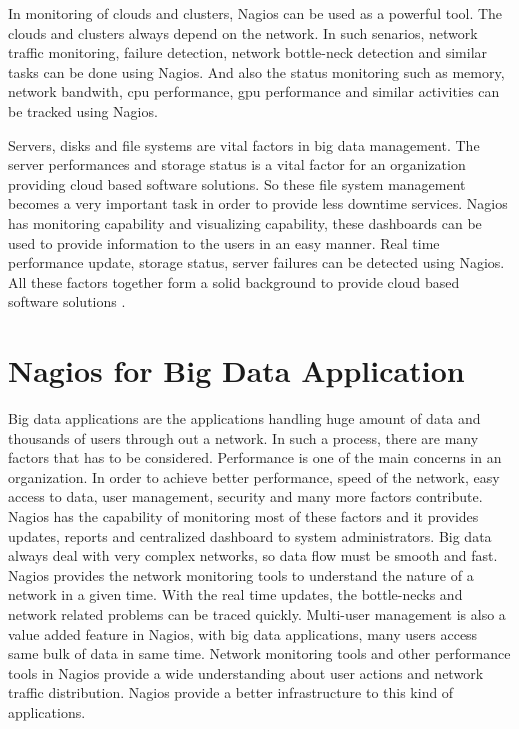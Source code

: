 \documentclass[9pt,twocolumn,twoside]{styles/osajnl}
\begin{document}
In monitoring of clouds and clusters, Nagios can be used as a powerful
tool. The clouds and clusters always depend on the network. In such
senarios, network traffic monitoring, failure detection, network
bottle-neck detection and similar tasks can be done using Nagios.
And also the status monitoring such as memory, network bandwith,
cpu performance, gpu performance and similar activities can be
tracked using Nagios. 

Servers, disks and file systems are vital factors in big data management.
The server performances and storage status is a vital factor for an
organization providing cloud based software solutions. So these file system
management becomes a very important task in order to provide less downtime
services. Nagios has monitoring capability and visualizing capability,
these dashboards can be used to provide information to the users in an easy
manner. Real time performance update, storage status, server failures can be
detected using Nagios. All these factors together form a solid background
to provide cloud based software solutions \cite{bigdata-nagios}.  

   
\section{Nagios for Big Data Application}

Big data applications are the applications handling huge amount of
data and thousands of users through out a network. In such a process,
there are many factors that has to be considered. Performance is
one of the main concerns in an organization. In order to achieve better
performance, speed of the network, easy access to data, user management,
security and many more factors contribute. Nagios has the capability of
monitoring most of these factors and it provides updates, reports and
centralized dashboard to system administrators. Big data always
deal with very complex networks, so data flow must be smooth and fast.
Nagios provides the network monitoring tools to understand the nature
of a network in a given time. With the real time updates, the bottle-necks
and network related problems can be traced quickly. Multi-user management
is also a value added feature in Nagios, with big data applications, many
users access same bulk of data in same time. Network monitoring tools and
other performance tools in Nagios provide a wide understanding about user
actions and network traffic distribution. Nagios provide a better infrastructure
to this kind of applications. 
\end{document}
